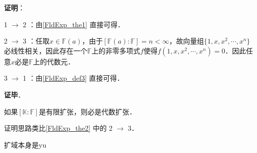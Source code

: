 \textbf{证明}：

1 $\to$ 2 ：由\autoref{FldExp_the1} 直接可得．

2 $\to$ 3 ：任取$x\in\mathbb{F}(a)$，由于$[\mathbb{F}(a):\mathbb{F}]=n<\infty$，故向量组$\{1, x, x^2, \cdots, x^n\}$必线性相关，因此存在一个$\mathbb{F}$上的非零多项式$f$使得$f(1, x, x^2, \cdots, x^n)=0$．因此任意$x$必是$\mathbb{F}$上的代数元．

3 $\to$ 1 ：由\autoref{FldExp_def3} 直接可得．

\textbf{证毕}．

\begin{corollary}{}
如果$[\mathbb{K}:\mathbb{F}]$是有限扩张，则必是代数扩张．
\end{corollary}

证明思路类比\autoref{FldExp_the2} 中的 2 $\to$ 3．

扩域本身是yu






















